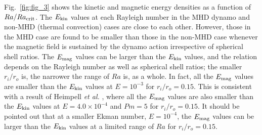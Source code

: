 

{\color{red} %
Fig.~\ref{fig:fig_3} shows the kinetic and magnetic energy densities as a function of $Ra / Ra_{\rm crit}$.
}
{\color{red} %
The $E_{\rm kin}$ values at each Rayleigh number in the MHD dynamo and non-MHD (thermal convection) cases are close to each other.
However, those in the MHD case are found to be smaller than those in the non-MHD case whenever the magnetic field is sustained by the dynamo action irrespective of spherical shell ratios.
The $E_{\rm mag}$ values can be larger than the $E_{\rm kin}$ values, and the relation depends on the Rayleigh number as well as spherical shell ratios; the smaller $r_i / r_o$ is, the narrower the range of $Ra$ is, as a whole.
In fact, all the $E_{\rm mag}$ values are smaller than the $E_{\rm kin}$ values at $E = 10^{-3}$ for $r_i / r_o = 0.15$.
This is consistent with a result of Heimpell {\it et al.} , where all the $E_{\rm mag}$ values are also smaller than the $E_{\rm kin}$ values at $E = 4.0 \times 10^{-4}$ and $Pm = 5$ for $r_i / r_o = 0.15$.
It should be pointed out that at a smaller Ekman number, $E = 10^{-4}$, the $E_{\rm mag}$ values can be larger than the $E_{\rm kin}$ values at a limited range of $Ra$ for $r_i / r_o = 0.15$.
}
% 

